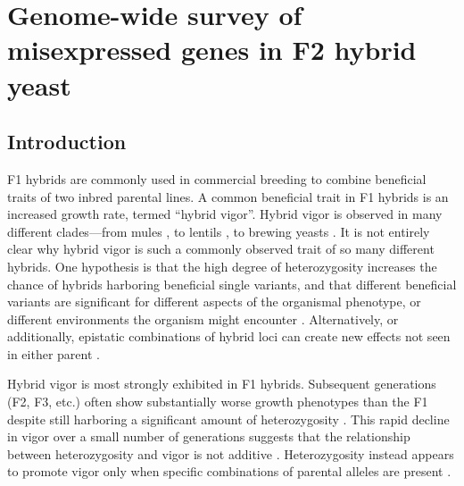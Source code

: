 \chapter{Genome-wide survey of misexpressed genes in F2 hybrid yeast}
\label{chpt:misexpression}

\section{Introduction}


F1 hybrids are commonly used in commercial breeding to combine beneficial traits of two inbred parental lines. A common beneficial trait in F1 hybrids is an increased growth rate, termed ``hybrid vigor''. Hybrid vigor is observed in many different clades---from mules \cite{Hutt1952}, to lentils \cite{Tan2022}, to brewing yeasts \cite{Gibson2017}. It is not entirely clear why hybrid vigor is such a commonly observed trait of so many different hybrids. One hypothesis is that the high degree of heterozygosity increases the chance of hybrids harboring beneficial single variants, and that different beneficial variants are significant for different aspects of the organismal phenotype, or different environments the organism might encounter \cite{Collins1921, Shapira2016, Zhang2020}. Alternatively, or additionally, epistatic combinations of hybrid loci can create new effects not seen in either parent \cite{Naseeb2021}.


Hybrid vigor is most strongly exhibited in F1 hybrids. Subsequent generations (F2, F3, etc.) often show substantially worse growth phenotypes than the F1 despite still harboring a significant amount of heterozygosity \cite{Larson1944}. This rapid decline in vigor over a small number of generations suggests that the relationship between heterozygosity and vigor is not additive \cite{Hallahan2018}. Heterozygosity instead appears to promote vigor only when specific combinations of parental alleles are present \cite{Wang2015}.

